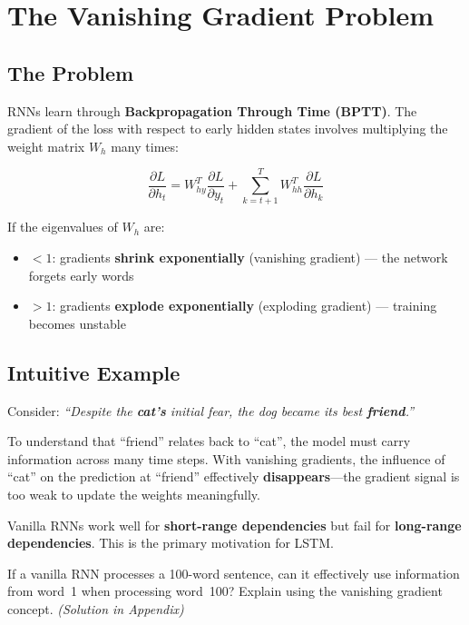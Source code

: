 \documentclass[11pt,a4paper]{article}
\begin{document}
\section{The Vanishing Gradient Problem}

\subsection{The Problem}

RNNs learn through \textbf{Backpropagation Through Time (BPTT)}. The gradient of the loss with respect to early hidden states involves multiplying the weight matrix $W_h$ many times:

\begin{equation}
\frac{\partial L}{\partial h_t} = W_{hy}^T \frac{\partial L}{\partial y_t} + \sum_{k=t+1}^{T} W_{hh}^T \frac{\partial L}{\partial h_k}
\end{equation}

If the eigenvalues of $W_h$ are:
\begin{itemize}[leftmargin=1.5em]
    \item $< 1$: gradients \textbf{shrink exponentially} (vanishing gradient) --- the network forgets early words
    \item $> 1$: gradients \textbf{explode exponentially} (exploding gradient) --- training becomes unstable
\end{itemize}

\subsection{Intuitive Example}

Consider: \textit{``Despite the \textbf{cat's} initial fear, the dog became its best \textbf{friend}.''}

To understand that ``friend'' relates back to ``cat'', the model must carry information across many time steps. With vanishing gradients, the influence of ``cat'' on the prediction at ``friend'' effectively \textbf{disappears}---the gradient signal is too weak to update the weights meaningfully.

\begin{tcolorbox}[warnbox={Result}]
Vanilla RNNs work well for \textbf{short-range dependencies} but fail for \textbf{long-range dependencies}. This is the primary motivation for LSTM.
\end{tcolorbox}

\begin{tcolorbox}[questionbox={Self-Check Q4}]
If a vanilla RNN processes a 100-word sentence, can it effectively use information from word~1 when processing word~100? Explain using the vanishing gradient concept. \textit{(Solution in Appendix)}
\end{tcolorbox}
\end{document}
